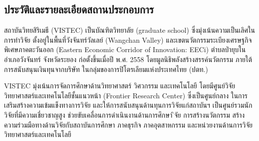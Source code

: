 \documentclass[16pt,a4]{internshipreport}
\begin{document}
\subsection{ประวัติและรายละเอียดสถานประกอบการ}
สถาบันวิทยสิริเมธี (VISTEC) เป็นบัณฑิตวิทยาลัย (graduate school) ซึ่งมุ่งเน้นความเป็นเลิศในการทำวิจัย 
ตั้งอยู่ในพื้นที่วังจันทร์วัลเลย์ (Wangchan Valley) และเขตนวัตกรรมระเบียงเศรษฐกิจพิเศษภาคตะวันออก
(Eastern Economic Corridor of Innovation: EECi) ตำบลป่ายุบใน อำเภอวังจันทร์ จังหวัดระยอง
ก่อตั้งขึ้นเมื่อปี พ.ศ. 2558 โดยมูลนิธิพลังสร้างสรรค์นวัตกรรม ภายใต้การสนับสนุนเงินทุนจากบริษัท
ในกลุ่มของการปิโตรเลียมแห่งประเทศไทย (ปตท.)

VISTEC มุ่งเน้นการจัดการศึกษาด้านวิทยาศาสตร์ วิศวกรรม และเทคโนโลยี โดยมีศูนย์วิจัยวิทยาศาสตร์และเทคโนโลยีชั้นแนวหน้า
(Frontier Research Center) ซึ่งเป็นศูนย์กลาง ในการเสริมสร้างความเข้มแข็งทางการวิจัย
และให้การสนับสนุนด้านทุนการวิจัยแก่สถาบันฯ เป็นศูนย์รวมนักวิจัยที่มีความเชี่ยวชาญสูง ช่วยขับเคลื่อนการดำเนินงานด้านการศึกษา 
ิจัย การสร้างนวัตกรรม สร้างความร่วมมือทางด้านวิจัยกับสถาบันการศึกษา ภาคธุรกิจ ภาคอุตสาหกรรม
และหน่วยงานด้านการวิจัยวิทยาศาสตร์และเทคโนโลยี
\end{document}
